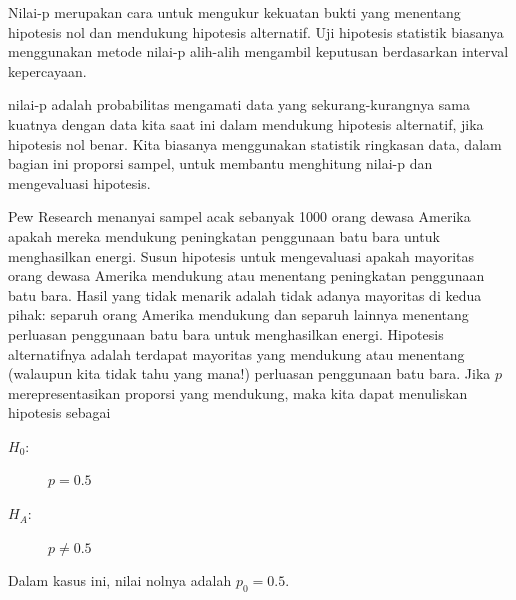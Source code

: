 \label{pValue}


Nilai-p merupakan cara untuk mengukur kekuatan
bukti yang menentang hipotesis nol dan mendukung
hipotesis alternatif.
Uji hipotesis statistik biasanya menggunakan
metode nilai-p alih-alih mengambil keputusan berdasarkan
interval kepercayaan.

\begin{onebox}{nilai-p}
  adalah probabilitas mengamati data yang sekurang-kurangnya sama kuatnya
  dengan data kita saat ini dalam mendukung hipotesis alternatif,
  jika hipotesis nol benar. Kita biasanya menggunakan statistik
  ringkasan data, dalam bagian ini proporsi sampel,
  untuk membantu menghitung nilai-p dan mengevaluasi hipotesis.
\end{onebox}



\newcommand{\pewcoalpollsize}{1000}
\newcommand{\pewcoalpollprop}{0.37}
\newcommand{\pewcoalpollpropcomplement}{0.63}
\newcommand{\pewcoalpollpercent}{37\%}
\newcommand{\pewcoalpollpercentcomplement}{63\%}
\newcommand{\pewcoalpollcount}{370}
\newcommand{\pewcoalpollcountcomplement}{630}
\newcommand{\pewcoalpollse}{0.0153}
\newcommand{\pewcoalpollnullvalue}{0.5}
\newcommand{\pewcoalpollnullse}{0.016}

\begin{examplewrap}
\begin{nexample}{Pew Research menanyai sampel acak sebanyak
    \pewcoalpollsize{} orang dewasa
    Amerika apakah mereka mendukung peningkatan penggunaan batu bara untuk
    menghasilkan energi.
    Susun hipotesis untuk mengevaluasi apakah
    mayoritas orang dewasa Amerika mendukung atau menentang
    peningkatan penggunaan batu bara.}
  Hasil yang tidak menarik adalah tidak adanya mayoritas di kedua pihak:
  separuh orang Amerika mendukung dan separuh lainnya menentang perluasan
  penggunaan batu bara untuk menghasilkan energi. Hipotesis alternatifnya
  adalah terdapat mayoritas yang mendukung atau menentang
  (walaupun kita tidak tahu yang mana!) perluasan
  penggunaan batu bara. Jika $p$ merepresentasikan proporsi yang mendukung, maka
  kita dapat menuliskan hipotesis sebagai
  \begin{description}
    \item[$H_0$:] $p = 0.5$
    \item[$H_A$:] $p \neq 0.5$
  \end{description}
  Dalam kasus ini, nilai nolnya adalah $p_0 = 0.5$.
\end{nexample}
\end{examplewrap}

